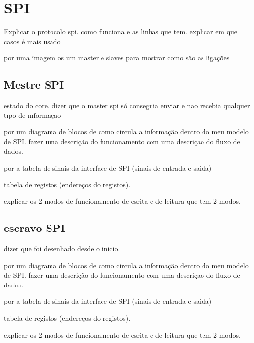 
\chapter{SPI}
\label{chapter:spi}


Explicar o protocolo spi. como funciona e as linhas que tem. explicar em que casos \'e mais usado

por uma imagem os um master e slaves para mostrar como s\~ao as liga\c{c}\~oes

\section{Mestre SPI}

estado do core.  dizer que o master spi s\'o conseguia enviar e nao recebia qualquer tipo de informa\c{c}\~ao

por um diagrama de blocos de como circula a informa\c{c}\~ao dentro do meu modelo de SPI. fazer uma descri\c{c}\~ao do funcionamento com uma descri\c{c}ao do fluxo de dados.

por a tabela de sinais da interface de SPI (sinais de entrada e saida)

tabela de registos (endere\c{c}os do registos).

explicar os 2 modos de funcionamento de esrita e de leitura que tem 2 modos.

\section{escravo SPI}

dizer que foi desenhado desde o inicio.

por um diagrama de blocos de como circula a informa\c{c}\~ao dentro do meu modelo de SPI. fazer uma descri\c{c}\~ao do funcionamento com uma descri\c{c}ao do fluxo de dados.

por a tabela de sinais da interface de SPI (sinais de entrada e saida)

tabela de registos (endere\c{c}os do registos).

explicar os 2 modos de funcionamento de esrita e de leitura que tem 2 modos.
